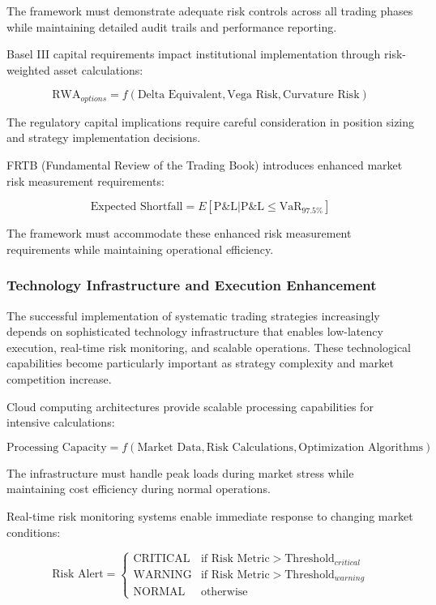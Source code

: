 \documentclass[
  american,
  11pt,
  11pt,
  letterpaper,
  onecolumn]{article}
\begin{document}
The framework must demonstrate adequate risk controls across all trading
phases while maintaining detailed audit trails and performance
reporting.

Basel III capital requirements impact institutional implementation
through risk-weighted asset calculations:

\[\text{RWA}_{options} = f(\text{Delta Equivalent}, \text{Vega Risk}, \text{Curvature Risk})\]

The regulatory capital implications require careful consideration in
position sizing and strategy implementation decisions.

FRTB (Fundamental Review of the Trading Book) introduces enhanced market
risk measurement requirements:

\[\text{Expected Shortfall} = E[\text{P\&L} | \text{P\&L} \leq \text{VaR}_{97.5\%}]\]

The framework must accommodate these enhanced risk measurement
requirements while maintaining operational efficiency.

\subsubsection{Technology Infrastructure and Execution
Enhancement}\label{technology-infrastructure-and-execution-enhancement}

The successful implementation of systematic trading strategies
increasingly depends on sophisticated technology infrastructure that
enables low-latency execution, real-time risk monitoring, and scalable
operations. These technological capabilities become particularly
important as strategy complexity and market competition increase.

Cloud computing architectures provide scalable processing capabilities
for intensive calculations:

\[\text{Processing Capacity} = f(\text{Market Data}, \text{Risk Calculations}, \text{Optimization Algorithms})\]

The infrastructure must handle peak loads during market stress while
maintaining cost efficiency during normal operations.

Real-time risk monitoring systems enable immediate response to changing
market conditions:

\[\text{Risk Alert} = \begin{cases}
\text{CRITICAL} & \text{if Risk Metric} > \text{Threshold}_{critical} \\
\text{WARNING} & \text{if Risk Metric} > \text{Threshold}_{warning} \\
\text{NORMAL} & \text{otherwise}
\end{cases}\]
\end{document}
